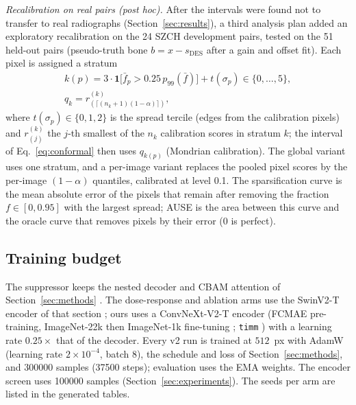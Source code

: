\emph{Recalibration on real pairs (post hoc).} After the intervals were found not to transfer to real radiographs
(Section~\ref{sec:results}), a third analysis plan added an exploratory recalibration on the 24 SZCH development pairs, tested on the 51
held-out pairs (pseudo-truth bone $b=x-s_{\mathrm{DES}}$ after a gain and offset fit). Each pixel is assigned a stratum
\begin{equation}
\begin{gathered}
k(p)=3\cdot\mathbf{1}\big[\bar f_p>0.25\,p_{99}(\bar f)\big]+t(\sigma_p)\in\{0,\dots,5\},\\
q_k=r^{(k)}_{(\lceil (n_k+1)(1-\alpha)\rceil)},
\end{gathered}
\label{eq:mondrian}
\end{equation}
where $t(\sigma_p)\in\{0,1,2\}$ is the spread tercile (edges from the calibration pixels) and $r^{(k)}_{(j)}$ the $j$-th smallest of the $n_k$
calibration scores in stratum $k$; the interval of Eq.~\eqref{eq:conformal} then uses $q_{k(p)}$ (Mondrian calibration). The global variant
uses one stratum, and a per-image variant replaces the pooled pixel scores by the per-image $(1-\alpha)$ quantiles, calibrated at level 0.1. The sparsification curve is the mean absolute error of the pixels that remain after removing the fraction $f\in[0,0.95]$ with the
largest spread; AUSE is the area between this curve and the oracle curve that removes pixels by their error (0 is perfect).

\subsection{Training budget}
The suppressor keeps the nested decoder and CBAM attention of Section~\ref{sec:methods} \citep{zhou2018unetpp,woo2018cbam}. The dose-response and
ablation arms use the SwinV2-T encoder of that section \citep{liu2022swinv2}; ours uses a ConvNeXt-V2-T encoder \citep{woo2023convnextv2}
(FCMAE pre-training, ImageNet-22k then ImageNet-1k fine-tuning \citep{deng2009imagenet}; \texttt{timm} \citep{wightman2019timm}
) with a learning
rate $0.25\times$ that of the decoder. Every v2 run is trained at $512$~px with AdamW \citep{loshchilov2019adamw} (learning rate $2\times10^{-4}$,
batch 8), the schedule and loss of Section~\ref{sec:methods}, and \num{300000} samples (\num{37500} steps); evaluation uses the EMA weights. The
encoder screen uses \num{100000} samples (Section~\ref{sec:experiments}). The seeds per arm are listed in the generated tables.
